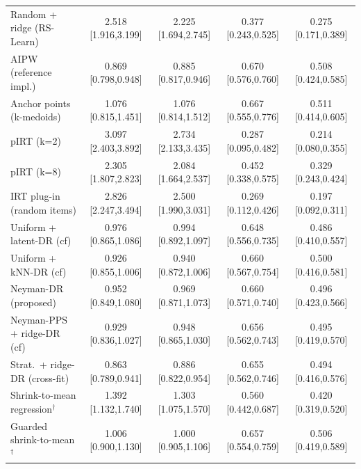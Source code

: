 \begin{tabular}{l cccc}
Random + ridge (RS-Learn) & 2.518 {\scriptsize[1.916,3.199]} & 2.225 {\scriptsize[1.694,2.745]} & 0.377 {\scriptsize[0.243,0.525]} & 0.275 {\scriptsize[0.171,0.389]} \\
AIPW (reference impl.) & 0.869 {\scriptsize[0.798,0.948]} & 0.885 {\scriptsize[0.817,0.946]} & 0.670 {\scriptsize[0.576,0.760]} & 0.508 {\scriptsize[0.424,0.585]} \\
Anchor points (k-medoids) & 1.076 {\scriptsize[0.815,1.451]} & 1.076 {\scriptsize[0.814,1.512]} & 0.667 {\scriptsize[0.555,0.776]} & 0.511 {\scriptsize[0.414,0.605]} \\
pIRT (k=2) & 3.097 {\scriptsize[2.403,3.892]} & 2.734 {\scriptsize[2.133,3.435]} & 0.287 {\scriptsize[0.095,0.482]} & 0.214 {\scriptsize[0.080,0.355]} \\
pIRT (k=8) & 2.305 {\scriptsize[1.807,2.823]} & 2.084 {\scriptsize[1.664,2.537]} & 0.452 {\scriptsize[0.338,0.575]} & 0.329 {\scriptsize[0.243,0.424]} \\
IRT plug-in (random items) & 2.826 {\scriptsize[2.247,3.494]} & 2.500 {\scriptsize[1.990,3.031]} & 0.269 {\scriptsize[0.112,0.426]} & 0.197 {\scriptsize[0.092,0.311]} \\
Uniform + latent-DR (cf) & 0.976 {\scriptsize[0.865,1.086]} & 0.994 {\scriptsize[0.892,1.097]} & 0.648 {\scriptsize[0.556,0.735]} & 0.486 {\scriptsize[0.410,0.557]} \\
Uniform + kNN-DR (cf) & 0.926 {\scriptsize[0.855,1.006]} & 0.940 {\scriptsize[0.872,1.006]} & 0.660 {\scriptsize[0.567,0.754]} & 0.500 {\scriptsize[0.416,0.581]} \\
Neyman-DR (proposed) & 0.952 {\scriptsize[0.849,1.080]} & 0.969 {\scriptsize[0.871,1.073]} & 0.660 {\scriptsize[0.571,0.740]} & 0.496 {\scriptsize[0.423,0.566]} \\
Neyman-PPS + ridge-DR (cf) & 0.929 {\scriptsize[0.836,1.027]} & 0.948 {\scriptsize[0.865,1.030]} & 0.656 {\scriptsize[0.562,0.743]} & 0.495 {\scriptsize[0.419,0.570]} \\
Strat.\ + ridge-DR (cross-fit) & 0.863 {\scriptsize[0.789,0.941]} & 0.886 {\scriptsize[0.822,0.954]} & 0.655 {\scriptsize[0.562,0.746]} & 0.494 {\scriptsize[0.416,0.576]} \\
Shrink-to-mean regression$^\dagger$ & 1.392 {\scriptsize[1.132,1.740]} & 1.303 {\scriptsize[1.075,1.570]} & 0.560 {\scriptsize[0.442,0.687]} & 0.420 {\scriptsize[0.319,0.520]} \\
Guarded shrink-to-mean$^\dagger$ & 1.006 {\scriptsize[0.900,1.130]} & 1.000 {\scriptsize[0.905,1.106]} & 0.657 {\scriptsize[0.554,0.759]} & 0.506 {\scriptsize[0.419,0.589]} \\

\end{tabular}
